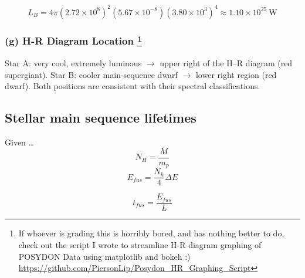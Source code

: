 \documentclass{article}
\begin{document}
\[
L_B = 4\pi(2.72\times10^{8})^2(5.67\times10^{-8})(3.80\times10^{3})^4
    \boxed{ \approx 1.10\times10^{25}~\mathrm{W}}
\]

\subsubsection*{(g) H-R Diagram Location \footnote{If whoever is grading this is horribly bored, and has nothing better to do, check out the script I wrote to streamline H-R diagram graphing of POSYDON Data using matplotlib and bokeh :) \url{https://github.com/PiersonLip/Posydon_HR_Graphing_Script} }}

Star A: very cool, extremely luminous $\rightarrow$ upper right of the H–R diagram (red supergiant).  
Star B: cooler main-sequence dwarf $\rightarrow$ lower right region (red dwarf).  
Both positions are consistent with their spectral classifications.

\begin{table}[htbp]
\end{table}


\subsection{Stellar main sequence lifetimes}
Given \dots
\begin{equation}
    N_H = \frac{M}{m_p} 
    \tag{15.52}
\end{equation}
\begin{equation}
    E_{fus} = \frac{N_h}{4}\Delta E
    \tag{15.53}
\end{equation}

\begin{equation}
    t_{fus} = \frac{E_{fus}}{L}
    \tag{15.54}
\end{equation}
\end{document}
